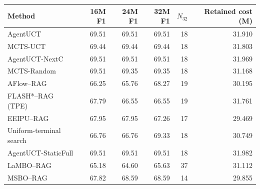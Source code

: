 \begin{tabular}{@{}lrrrrr@{}}
\toprule
Method & 16M F1 & 24M F1 & 32M F1 & $N_{32}$ & Retained cost (M)\\
\midrule
AgentUCT & 69.51 & 69.51 & 69.51 & 18 & 31.910\\
MCTS-UCT & 69.44 & 69.44 & 69.44 & 18 & 31.803\\
AgentUCT-NextC & 69.51 & 69.51 & 69.51 & 18 & 31.969\\
MCTS-Random & 69.51 & 69.35 & 69.35 & 18 & 31.168\\
AFlow--RAG & 66.25 & 65.76 & 68.27 & 19 & 30.195\\
FLASH*--RAG (TPE) & 67.79 & 66.55 & 66.55 & 19 & 31.761\\
EEIPU--RAG & 67.95 & 67.95 & 67.26 & 17 & 29.469\\
Uniform-terminal search & 66.76 & 66.76 & 69.33 & 18 & 30.749\\
AgentUCT-StaticFull & 69.51 & 69.51 & 69.51 & 18 & 31.982\\
LaMBO--RAG & 65.18 & 64.60 & 65.63 & 37 & 31.112\\
MSBO--RAG & 67.82 & 68.59 & 68.59 & 14 & 29.855\\
\bottomrule
\end{tabular}
